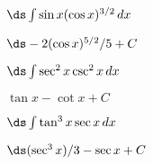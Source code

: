 \begin{exercises}
\begin{exercise} $\ds\int \sin x (\cos x)^{3/2}\,dx$
\begin{answer} $\ds -2(\cos x)^{5/2}/5+C$
\end{answer}\end{exercise}

\begin{exercise} $\ds\int \sec^2 x\csc^2 x\,dx$
\begin{answer} $\tan x-\cot x+C$
\end{answer}\end{exercise}

\begin{exercise} $\ds\int \tan^3x \sec x\,dx$
\begin{answer} $\ds (\sec^3x)/3-\sec x+C$
\end{answer}\end{exercise}

\endtwocol

\end{exercises}

